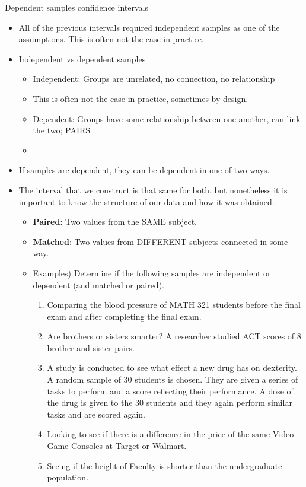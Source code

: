 \documentclass{article}
\begin{document}
Dependent samples confidence intervals\bigskip
\begin{itemize}
    \item All of the previous intervals required independent samples as one of the assumptions. This is often not the case in practice.
    \item Independent vs dependent samples
    \begin{itemize}
        \item Independent: Groups are unrelated, no connection, no relationship
        \item[] This is often not the case in practice, sometimes by design.
        \item Dependent:  Groups have some relationship between one another, can link the two; PAIRS
        \item[] 
    \end{itemize}
    \item If samples are dependent, they can be dependent in one of two ways.
    \item[] The interval that we construct is that same for both, but nonetheless it is important to know the structure of our data and how it was obtained.
    \begin{itemize}
        \item \textbf{Paired}: Two values from the SAME subject.
        \item \textbf{Matched}: Two values from DIFFERENT subjects connected in some way.
        \item Examples) Determine if the following samples are independent or dependent (and matched or paired).
        \begin{enumerate}
            \item Comparing the blood pressure of MATH 321 students before the final exam and after completing the final exam.
            \item Are brothers or sisters smarter? A researcher studied ACT scores of 8 brother and sister pairs.
            \item A study is conducted to see what effect a new drug has on dexterity. A random sample of 30 students is chosen. They are given a series of tasks to perform and a score reflecting their performance. A dose of the drug is given to the 30 students and they again perform similar tasks and are scored again.
            \item Looking to see if there is a difference in the price of the same Video Game Consoles at Target or Walmart.
            \item Seeing if the height of Faculty is shorter than the undergraduate population.

\end{enumerate}
\end{itemize}
\end{itemize}
\end{document}
